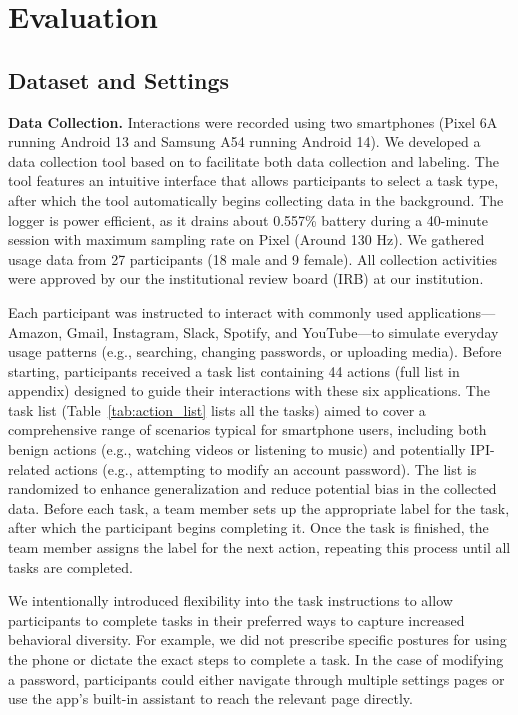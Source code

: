 \section{Evaluation}\label{sec-5-eval}


\subsection{Dataset and Settings}


\noindent\textbf{Data Collection.} Interactions were recorded using two smartphones (Pixel 6A running Android 13 and Samsung A54 running Android 14). We developed a data collection tool based on \sys to facilitate both data collection and labeling. The tool features an intuitive interface that allows participants to select a task type, after which the tool automatically begins collecting data in the background. The logger is power efficient, as it drains about 0.557\% battery during a 40-minute session with maximum sampling rate on Pixel (Around 130 Hz). We gathered usage data from 27 participants (18 male and 9 female).  All collection activities were approved by our the institutional review board (IRB) at our institution.

Each participant was instructed to interact with commonly used applications—Amazon, Gmail, Instagram, Slack, Spotify, and YouTube—to simulate everyday usage patterns (e.g., searching, changing passwords, or uploading media). Before starting, participants received a task list containing 44 actions (full list in appendix) designed to guide their interactions with these six applications. The task list (Table~\ref{tab:action_list} lists all the tasks) aimed to cover a comprehensive range of scenarios typical for smartphone users, including both benign actions (e.g., watching videos or listening to music) and potentially IPI-related actions (e.g., attempting to modify an account password). The list is randomized to enhance generalization and reduce potential bias in the collected data. Before each task, a team member sets up the appropriate label for the task, after which the participant begins completing it. Once the task is finished, the team member assigns the label for the next action, repeating this process until all tasks are completed.

We intentionally introduced flexibility into the task instructions to allow participants to complete tasks in their preferred ways to capture increased behavioral diversity. For example, we did not prescribe specific postures for using the phone or dictate the exact steps to complete a task. In the case of modifying a password, participants could either navigate through multiple settings pages or use the app's built-in assistant to reach the relevant page directly. %

